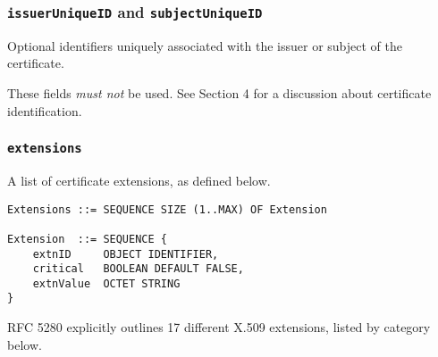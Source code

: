 \subsubsection{\texttt{issuerUniqueID} and \texttt{subjectUniqueID}}

Optional identifiers uniquely associated with the issuer or subject of the certificate.

These fields \textit{must not} be used.
See Section 4 for a discussion about certificate identification.

\subsubsection{\texttt{extensions}}

A list of certificate extensions, as defined below.

\begin{verbatim}
Extensions ::= SEQUENCE SIZE (1..MAX) OF Extension

Extension  ::= SEQUENCE {
    extnID     OBJECT IDENTIFIER,
    critical   BOOLEAN DEFAULT FALSE,
    extnValue  OCTET STRING
}
\end{verbatim}

RFC 5280 explicitly outlines 17 different X.509 extensions, listed by category below.

